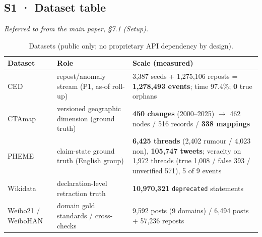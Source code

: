 \subsection*{S1 · Dataset table}
\noindent\emph{Referred to from the main paper, \S7.1 (Setup).}

\begin{table}[htbp]
\caption{Datasets (public only; no proprietary API dependency by design).}
\label{stab:data}
\centering
\scriptsize
\renewcommand{\arraystretch}{1.16}
\begin{tabular}{@{}p{}p{}p{}@{}}
\toprule
\textbf{Dataset} & \textbf{Role} & \textbf{Scale (measured)}\\
\midrule
CED \cite{r6} & repost/anomaly stream (P1, as-of roll-up) & 3,387 seeds + 1,275,106 reposts = \textbf{1,278,493 events}; time 97.4\%; \textbf{0} true orphans\\
CTAmap \cite{r14} & versioned geographic dimension (ground truth) & \textbf{450 changes} (2000--2025) $\to$ 462 nodes / 516 records / \textbf{338 mappings}\\
PHEME \cite{r5} & claim-state ground truth (English group) & \textbf{6,425 threads} (2,402 rumour / 4,023 non), \textbf{105,747 tweets}; veracity on 1,972 threads (true 1,008 / false 393 / unverified 571), 5 of 9 events\\
Wikidata \cite{r15} & declaration-level retraction truth & \textbf{10,970,321} \texttt{deprecated} statements\\
Weibo21 / WeiboHAN \cite{r67} & domain gold standards / cross-checks & 9,592 posts (9 domains) / 6,494 posts + 57,236 reposts\\
\bottomrule
\end{tabular}
\end{table}
